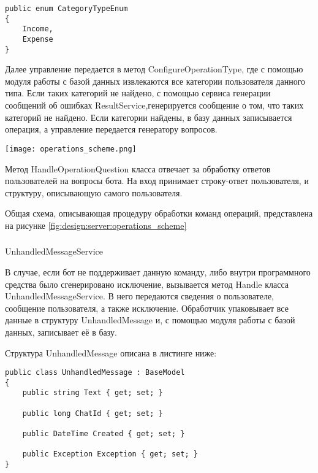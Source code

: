 \lstset{style=sharpc}
\begin{lstlisting}
public enum CategoryTypeEnum
{
	Income,
	Expense
}
\end{lstlisting}

Далее управление передается в метод ConfigureOperationType, где с помощью модуля работы с базой данных извлекаются все категории
пользователя данного типа. Если таких категорий не найдено, с помощью сервиса генерации сообщений об ошибках ResultService,генерируется сообщение о том, что таких категорий не найдено. Если категории найдены, в базу данных записывается операция, а управление передается генератору вопросов.

\begin{sidewaysfigure}
\centering
	\texttt{[image: operations\_scheme.png]}
	\caption{Общая схема работы сервиса операций}
	\label{fig:design:server:operations_scheme}
\end{sidewaysfigure}


\newpage

Метод HandleOperationQuestion класса отвечает за обработку ответов пользователей на вопросы бота. На вход принимает строку-ответ пользователя, и структуру, описывающую самого пользователя.

Общая схема, описывающая процедуру обработки команд операций, представлена на рисунке \ref{fig:design:server:operations_scheme}

\subsubsection{} UnhandledMessageService
\label{sec:design:server:UnhandledMessageService}

В случае, если бот не поддерживает данную команду, либо внутри программного средства было сгенерировано исключение, вызывается метод Handle класса UnhandledMessageService. В него передаются сведения о пользователе, сообщение пользователя, а также исключение. Обработчик упаковывает все данные в структуру UnhandledMessage и, с помощью модуля работы с базой данных, записывает её в базу. 

\newpage

Структура UnhandledMessage описана в листинге ниже:

\lstset{style=sharpc}
\begin{lstlisting}
public class UnhandledMessage : BaseModel
{
	public string Text { get; set; }

	public long ChatId { get; set; }

	public DateTime Created { get; set; }

	public Exception Exception { get; set; }
}
\end{lstlisting}

